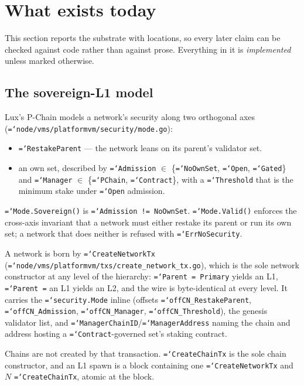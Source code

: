\documentclass[11pt,a4paper]{article}
\newcommand{\code}[1]{\texttt{\hyphenchar\font=`\-\relax #1}}
\begin{document}
\section{What exists today}

This section reports the substrate with locations, so every later claim can be
checked against code rather than against prose. Everything in it is
\emph{implemented} unless marked otherwise.

\subsection{The sovereign-L1 model}
\label{sec:sovereign}

Lux's P-Chain models a network's security along two orthogonal axes
(\code{node/vms/platformvm/security/mode.go}):

\begin{itemize}
  \item \code{RestakeParent} --- the network leans on its parent's validator set.
  \item an own set, described by \code{Admission} $\in$
    \{\code{NoOwnSet}, \code{Open}, \code{Gated}\} and \code{Manager} $\in$
    \{\code{PChain}, \code{Contract}\}, with a \code{Threshold} that is the
    minimum stake under \code{Open} admission.
\end{itemize}

\code{Mode.Sovereign()} is \code{Admission != NoOwnSet}. \code{Mode.Valid()}
enforces the cross-axis invariant that a network must either restake its parent
or run its own set; a network that does neither is refused with
\code{ErrNoSecurity}.

A network is born by \code{CreateNetworkTx}
(\code{node/vms/platformvm/txs/create\_network\_tx.go}), which is the sole
network constructor at any level of the hierarchy: \code{Parent = Primary}
yields an L1, \code{Parent =} an L1 yields an L2, and the wire is byte-identical
at every level. It carries the \code{security.Mode} inline (offsets
\code{offCN\_RestakeParent}, \code{offCN\_Admission}, \code{offCN\_Manager},
\code{offCN\_Threshold}), the genesis validator list, and
\code{ManagerChainID}/\code{ManagerAddress} naming the chain and address hosting
a \code{Contract}-governed set's staking contract.

Chains are not created by that transaction. \code{CreateChainTx} is the sole
chain constructor, and an L1 spawn is a block containing one
\code{CreateNetworkTx} and $N$ \code{CreateChainTx}, atomic at the block.
\end{document}
